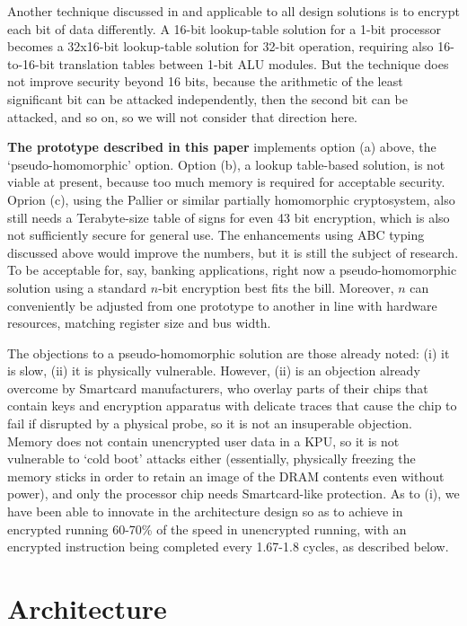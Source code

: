 \documentclass[conference]{IEEEtran}
\def\para#1{{\bf{#1}}}
\begin{document}
Another technique discussed in \cite{BB14b} and applicable to
all design solutions is to encrypt each bit of data differently.  A
16-bit lookup-table solution for a 1-bit processor becomes a 32x16-bit
lookup-table solution for 32-bit operation, requiring also 16-to-16-bit
translation tables between 1-bit ALU modules.  But the technique does
not improve security beyond 16 bits, because the arithmetic of the least
significant bit can be attacked independently, then the second bit can
be attacked, and so on, so we will not consider that direction here.

\para{The prototype described in this paper} implements option (a)
above, the `pseudo-homomorphic' option.  Option (b), a lookup
table-based solution, is not viable at present, because too much memory
is required for acceptable security.  Oprion (c), using the Pallier or
similar partially homomorphic cryptosystem, also still needs a
Terabyte-size table of signs for even 43 bit encryption, which is also
not sufficiently secure for general use.  The enhancements using ABC
typing discussed above would improve the numbers, but it is still the
subject of research.  To be acceptable for, say, banking applications,
right now a pseudo-homomorphic solution using a standard $n$-bit
encryption best fits the bill.  Moreover, $n$ can conveniently be
adjusted from one prototype to another in line with hardware resources,
matching register size and bus width.

The objections to a pseudo-homomorphic solution are those already noted:
(i) it is slow, (ii) it is physically vulnerable.  However, (ii) is an
objection already overcome  \cite{SmartCard} by Smartcard manufacturers,
who overlay parts of their chips that contain keys and encryption
apparatus with delicate traces that cause the chip to fail if disrupted
by a physical probe, so it is not an insuperable
objection.  Memory does not contain unencrypted user data in a KPU, so
it is not vulnerable to `cold boot' \cite{Simmons:2011, Gruhn2013,
halderman2009lest} attacks either (essentially, physically freezing the
memory sticks in order to retain an image of the DRAM contents even
without power), and only the processor chip needs Smartcard-like
protection.  As to (i), we have been able to innovate in the
architecture design so as to achieve in encrypted running 60-70\% of the
speed in unencrypted running, with an encrypted instruction being
completed every 1.67-1.8 cycles, as described below.

\section{Architecture}
\end{document}
